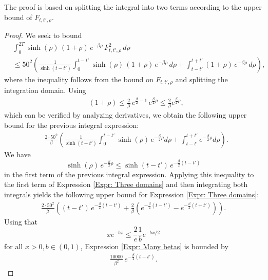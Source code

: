 \documentclass[11pt,twoside,reqno]{amsart} \usepackage{a4wide} \usepackage[T1]{fontenc} \usepackage[utf8]{inputenc} \usepackage{soul}  \usepackage{amsmath} \usepackage{amsfonts} \usepackage{amssymb} \usepackage{mathtools} \usepackage{amsthm} \usepackage{xcolor} \usepackage{graphicx} \usepackage{hyperref} \usepackage{standalone} \usepackage{esint} \usepackage{comment} \usepackage[left=2.3cm,top=3cm,right=2.3cm]{geometry} \usepackage{bm} \usepackage{svg} \usepackage{float} \numberwithin{equation}{section} \theoremstyle{plain} \newtheorem{thm}{Theorem}[section] \newtheorem{theorem}[thm]{Theorem} \newtheorem*{theorem*}{Theorem}\newtheorem{conj}[thm]{Conjecture} \newtheorem{lemma}[thm]{Lemma} \newtheorem{prop}[thm]{Proposition} \newtheorem{proposition}[thm]{Proposition} \newtheorem{cor}[thm]{Corollary} \newtheorem{question}[thm]{Question} \newtheorem{corollary}[thm]{Corollary} \newtheorem{assumption}[thm]{Assumption} \theoremstyle{definition} \newtheorem{defn}[thm]{Definition} \newtheorem{choice}[thm]{Choice} \newtheorem{definition}[thm]{Definition} \newtheorem{ex}[thm]{Example} \newtheorem{notation}[thm]{Notation} \newtheorem*{ack}{Acknowledgements} \theoremstyle{remark} \newtheorem{remark}[thm]{Remark} \newtheorem{bigremark}[thm]{Remark} \usepackage{xcolor} \newcommand{\red}[1]{ {\color{Red}#1} } \newcommand{\blue}[1]{ {\color{Blue}#1} } \author{Kai Hippi} \address{Aalto University, Espoo, Finland} \email{kai.hippi@aalto.fi}
\begin{document}
The proof is based on splitting the integral into two terms according to the upper bound of \( F_{t,t',\rho} \).

\begin{proof}[Proof]

	We seek to bound
\begin{align*}
	&
\int_{0}^{2T} \sinh(\rho) \, (1 + \rho) \, e^{-\beta \rho} \, F_{t,t',\rho}^{2} \, d\rho 
\\
&\leq 50^{2} \left( \frac{1}{\sinh(t - t')} \int_{0}^{t - t'} \sinh(\rho) \, (1 + \rho) \, e^{-\beta \rho} \, d\rho 
+ \int_{t - t'}^{t + t'} (1 + \rho) \, e^{-\beta \rho} \, d\rho \right),
\end{align*}
where the inequality follows from the bound on \( F_{t,t',\rho} \) and splitting the integration domain. Using
	\begin{align*}
		&
		( 1 + \rho ) \leq \frac{2}{\beta} \, e^{ \frac{\beta}{2} - 1 } \, e^{ \frac{\beta}{2} \rho } \leq \frac{2}{\beta} e^{ \tfrac{ \beta }{2} \rho },
	\end{align*}
	which can be verified by analyzing derivatives, we obtain the following upper bound for the previous integral expression:
	\begin{align}
		&
		\label{Expr: Three domains}
		\frac{2 \cdot 50^{2} }{ \beta}\left( \frac{ 1 }{ \sinh( t - t' )  } \int_{0}^{t-t'}   \sinh( \rho )  \, e^{ - \frac{\beta}{2} \rho }  d \rho + \int_{t-t'}^{t + t'} e^{ - \frac{\beta}{2} \rho } d \rho \right).
	\end{align}
	We have
\[
\sinh(\rho)\, e^{-\tfrac{\beta}{2}\rho} 
\leq 
\sinh(t - t')\, e^{-\tfrac{\beta}{2}(t - t')}
\]
in the first term of the previous integral expression. Applying this inequality to the first term of Expression \eqref{Expr: Three domains} and then integrating both integrals yields the following upper bound for Expression \eqref{Expr: Three domains}:
\begin{align}
	\label{Expr: Many betas}
\frac{2 \cdot 50^{2}}{\beta}\left(
(t - t')\, e^{-\tfrac{\beta}{2}(t - t')}
+
\frac{2}{\beta}
\left(
e^{-\tfrac{\beta}{2}(t - t')}
-
e^{-\tfrac{\beta}{2}(t + t')}
\right)
\right).
\end{align}
Using that
\[
x e^{-b x} \leq \frac{2}{e}\frac{1}{b} e^{-b x/2}
\]
for all \( x > 0, b \in ( 0,1 ) \), Expression \eqref{Expr: Many betas} is bounded by
\begin{align*}
\frac{10000}{\beta^{2}} \, e^{-\frac{\beta}{4}(t - t')}.
\end{align*}

\end{proof}
\end{document}
